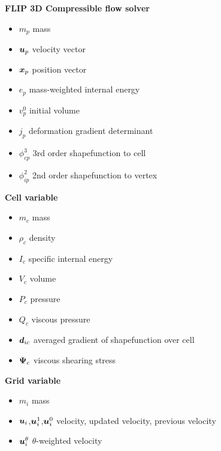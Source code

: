 \documentclass[11pt]{article}
\def\bbf#1{\mathchoice{\hbox{\boldmath$\displaystyle#1$}}
{\hbox{\boldmath$\textstyle#1$}} {\hbox{\boldmath$\scriptstyle#1$}} {\hbox{\boldmath$\scriptscriptstyle#1$}} }
\renewcommand{\mp}{m_{p}}
\newcommand{\pcp}{\phi_{cp}^3}
\newcommand{\pip}{\phi_{ip}^2}
\newcommand{\ui}{\bbf{u}_i}
\newcommand{\uiz}{\bbf{u}_i^{0}}
\newcommand{\uio}{\bbf{u}_i^{1}}
\newcommand{\uit}{\bbf{u}_i^{\theta}}
\newcommand{\up}{\bbf{u}_p}
\newcommand{\xp}{\bbf{x}_p}
\newcommand{\ep}{e_p}
\newcommand{\mi}{m_i}
\renewcommand{\mp}{m_p}
\newcommand{\rhoc}{\rho_c}
\newcommand{\Vc}{V_c}
\newcommand{\ic}{I_c}
\newcommand{\pc}{P_c}
\newcommand{\qc}{Q_c}
\newcommand{\psic}{\bbf{\Psi}_c}
\newcommand{\dic}{\bbf{d}_{ic}}
\begin{document}

\begin{center}
{\bf\Large FLIP 3D Compressible flow solver}
\end{center}

\begin{itemize}
    \item $\mp$ mass
    \item $\up$ velocity vector
    \item $\xp$ position vector
    \item $\ep$ mass-weighted internal energy
    \item $v_p^0$ initial volume
    \item $j_p$ deformation gradient determinant
    \item $\pcp$ 3rd order shapefunction to cell
    \item $\pip$ 2nd order shapefunction to vertex
\end{itemize}
{\large \bf Cell variable} %
\begin{itemize}
    \item $m_c$ mass
    \item $\rhoc$ density
    \item $\ic$ specific internal energy
    \item $\Vc$ volume
    \item $\pc$ pressure
    \item $\qc$ viscous pressure
    \item $\dic$ averaged gradient of shapefunction over cell
    \item $\psic$ viscous shearing stress
\end{itemize}
{\large \bf Grid variable} %
\begin{itemize}
    \item $\mi$ mass
    \item $\ui$,$\uio$,$\uiz$ velocity, updated velocity, previous velocity
    \item $\uit$ $\theta$-weighted velocity
\end{itemize}
\end{document}
